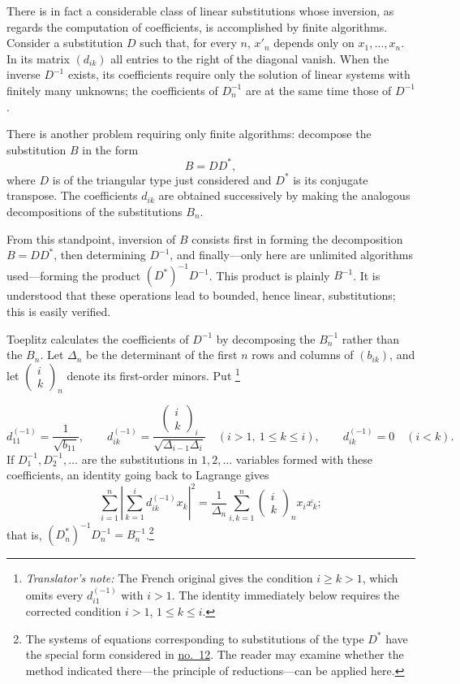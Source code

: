 \documentclass[
  paper=b5,
  fontsize=13pt,
  twoside=true,
  open=any,
  bookmarkpackage=false,
  chapterprefix=true,
  headings=normal
]{scrbook}
\theoremstyle{definition}
\newcounter{translatornote}
\newcommand{\translatornotelabel}{T\arabic{translatornote}}
\newcommand{\translatornote}[1]{%
  \stepcounter{translatornote}%
  \begingroup
    \edef\savedfootnotenumber{\number\value{footnote}}%
    \renewcommand{\thefootnote}{\translatornotelabel}%
    \footnote{\emph{Translator's note:} #1}%
    \setcounter{footnote}{\savedfootnotenumber}%
  \endgroup
}
\begin{document}
There is in fact a considerable class of linear substitutions whose
inversion, as regards the computation of coefficients, is accomplished by
finite algorithms. Consider a substitution $D$ such that, for every $n$,
$x'_n$ depends only on $x_1,\ldots,x_n$. In its matrix $(d_{ik})$ all
entries to the right of the diagonal vanish. When the inverse $D^{-1}$
exists, its coefficients require only the solution of linear systems with
finitely many unknowns; the coefficients of $D_n^{-1}$ are at the same time
those of $D^{-1}$.

There is another problem requiring only finite algorithms: decompose the
substitution
$B$ in the form
\[
  B=DD^*,
\]
where $D$ is of the triangular type just considered and $D^*$ is its
conjugate transpose. The coefficients $d_{ik}$ are obtained successively by
making the analogous decompositions of the substitutions $B_n$.

From this standpoint, inversion of $B$ consists first in forming the
decomposition $B=DD^*$, then determining $D^{-1}$, and finally---only here
are unlimited algorithms used---forming the product $(D^*)^{-1}D^{-1}$.
This product is plainly $B^{-1}$. It is understood that these operations
lead to bounded, hence linear, substitutions; this is easily verified.

Toeplitz calculates the coefficients of $D^{-1}$ by decomposing the
$B_n^{-1}$ rather than the $B_n$. Let $\Delta_n$ be the determinant of the
first $n$ rows and columns of $(b_{ik})$, and let
$\left(\begin{smallmatrix}i\\k\end{smallmatrix}\right)_n$ denote its
first-order minors. Put\translatornote{The French original gives the condition
\(i\ge k>1\), which omits every \(d_{i1}^{(-1)}\) with \(i>1\).  The identity
immediately below requires the corrected condition \(i>1\), \(1\le k\le i\).}
\[
 d_{11}^{(-1)}=\frac1{\sqrt{b_{11}}},\qquad
 d_{ik}^{(-1)}=
 \frac{\left(\begin{smallmatrix}i\\k\end{smallmatrix}\right)_i}
      {\sqrt{\Delta_{i-1}\Delta_i}}
 \quad(i>1,\ 1\leq k\leq i),
 \qquad d_{ik}^{(-1)}=0\quad(i<k).
\]
If $D_1^{-1},D_2^{-1},\ldots$ are the substitutions in
$1,2,\ldots$ variables formed with these coefficients, an identity going
back to Lagrange gives
\[
 \sum_{i=1}^{n}\left|\sum_{k=1}^{i}d_{ik}^{(-1)}x_k\right|^2
 =\frac1{\Delta_n}\sum_{i,k=1}^{n}
   \left(\begin{smallmatrix}i\\k\end{smallmatrix}\right)_n
   x_i\overline{x_k};
\]
that is, $(D_n^*)^{-1}D_n^{-1}=B_n^{-1}$.\footnote{The systems of
equations corresponding to substitutions of the type $D^*$ have the
special form considered in \hyperref[sec:12]{no.~12}. The reader may examine whether the
method indicated there---the principle of reductions---can be applied
here.}
\end{document}
